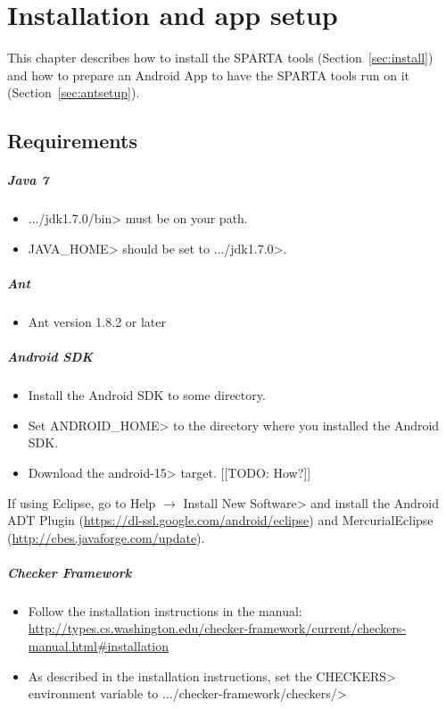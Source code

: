 \htmlhr
\chapter{Installation and app setup\label{installation}}

This chapter describes how to install the SPARTA tools
(Section~\ref{sec:install}) and how to prepare an Android App to have the
SPARTA tools run on it (Section~\ref{sec:antsetup}).

\section {Requirements\label{sec:requirements}}
\paragraph{Java 7}
\begin{itemize}
 \item  \<.../jdk1.7.0/bin> must be on your path.
 \item \<JAVA\_HOME> should be set to \<.../jdk1.7.0>.
\end{itemize}

\paragraph{Ant}
\begin{itemize}
 \item Ant version 1.8.2 or later
\end{itemize}

\paragraph{Android SDK}
\begin{itemize}
 \item Install the Android SDK to some directory. 
 \item Set \<ANDROID\_HOME> to the directory where you installed the
   Android SDK.
 \item Download the \<android-15> target.  [[TODO: How?]]
\end{itemize}

If using Eclipse, go to
\<Help $\rightarrow$ Install New Software>
and install the Android ADT Plugin (\url{https://dl-ssl.google.com/android/eclipse}) and MercurialEclipse (\url{http://cbes.javaforge.com/update}).

\paragraph{Checker Framework}
\begin{itemize}
\item Follow the installation instructions in the manual: 
\url{http://types.cs.washington.edu/checker-framework/current/checkers-manual.html#installation}
\item As described in the installation instructions, set the \<CHECKERS>
  environment variable to \<.../checker-framework/checkers/>
\end{itemize}


